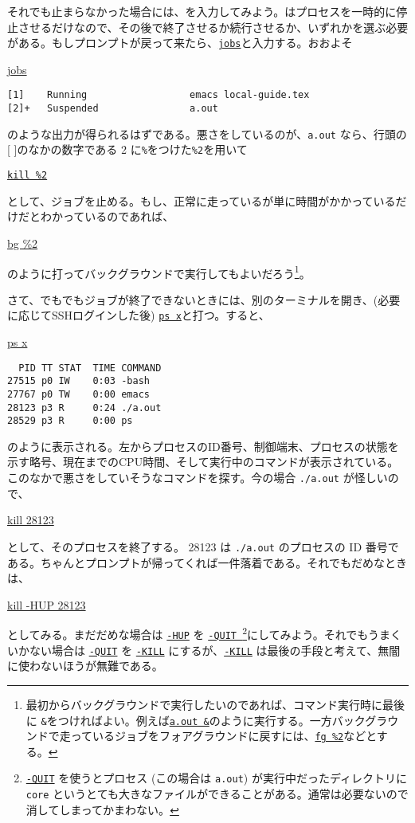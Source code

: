 それでも止まらなかった場合には、を入力してみよう。はプロセスを一時的に停止させるだけなので、その後で終了させるか続行させるか、いずれかを選ぶ必要がある。もしプロンプトが戻って来たら、\underline{\tt jobs}と入力する。おおよそ
\begin{commandline2}
\prompt \underline{jobs}
\vspace*{-.8em} 
\begin{verbatim}
[1]    Running                  emacs local-guide.tex
[2]+   Suspended                a.out
\end{verbatim}
\end{commandline2} \noindent
のような出力が得られるはずである。悪さをしているのが、{\tt a.out} なら、行頭の[ ]のなかの数字である 2 に{\tt \%}をつけた{\tt \%2}を用いて
\begin{commandline2}
\prompt \underline{\tt kill \%2}
\end{commandline2} \noindent
として、ジョブを止める。もし、正常に走っているが単に時間がかかっているだけだとわかっているのであれば、
\begin{commandline2}
\prompt \underline{bg \%2}
\end{commandline2} \noindent
のように打ってバックグラウンドで実行してもよいだろう\footnote{最初からバックグラウンドで実行したいのであれば、コマンド実行時に最後に {\tt \&}をつければよい。例えば\underline{\tt a.out \&}のように実行する。一方バックグラウンドで走っているジョブをフォアグラウンドに戻すには、\underline{\tt fg \%2}などとする。}。

さて、でもでもジョブが終了できないときには、別のターミナルを開き、(必要に応じてSSHログインした後) \underline{\tt ps x}と打つ。すると、
\begin{commandline2}
\prompt \underline{ps x}
\begin{verbatim}
  PID TT STAT  TIME COMMAND
27515 p0 IW    0:03 -bash
27767 p0 TW    0:00 emacs
28123 p3 R     0:24 ./a.out
28529 p3 R     0:00 ps
\end{verbatim}
\end{commandline2} \noindent
のように表示される。左からプロセスのID番号、制御端末、プロセスの状態を示す略号、現在までのCPU時間、そして実行中のコマンドが表示されている。このなかで悪さをしていそうなコマンドを探す。今の場合 {\tt ./a.out} が怪しいので、
\begin{commandline2}
\prompt \underline{kill 28123}
\end{commandline2} \noindent
として、そのプロセスを終了する。 28123 は {\tt ./a.out} のプロセスの ID 番号である。ちゃんとプロンプトが帰ってくれば一件落着である。それでもだめなときは、
\begin{commandline2}
\prompt \underline{kill -HUP 28123}
\end{commandline2} \noindent
としてみる。まだだめな場合は \underline{\tt -HUP} を \underline{\tt -QUIT }\footnote{\underline{\tt -QUIT} を使うとプロセス (この場合は {\tt a.out}) が実行中だったディレクトリに{\tt core} というとても大きなファイルができることがある。通常は必要ないので消してしまってかまわない。}にしてみよう。それでもうまくいかない場合は \underline{\tt -QUIT} を \underline{\tt -KILL} にするが、\underline{\tt -KILL} は最後の手段と考えて、無闇に使わないほうが無難である。

